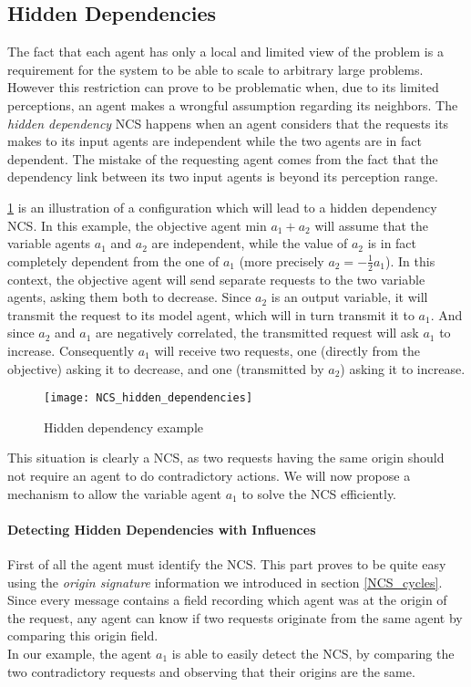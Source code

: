 \subsection{Hidden Dependencies}\label{hidden_deps}

The fact that each agent has only a local and limited view of the problem is a requirement for the system to be able to scale to arbitrary large problems. However this restriction can prove to be problematic when, due to its limited perceptions, an agent makes a wrongful assumption regarding its neighbors. The \emph{hidden dependency} NCS happens when an agent considers that the requests its makes to its input agents are independent while the two agents are in fact dependent. The mistake of the requesting agent comes from the fact that the dependency link between its two input agents is beyond its perception range.

\figurename{} \ref{NCS_hidden_dependencies} is an illustration of a configuration which will lead to a hidden dependency NCS. In this example, the objective agent $\text{min }a_1 + a_2$ will assume that the variable agents $a_1$ and $a_2$ are independent, while the value of $a_2$ is in fact completely dependent from the one of $a_1$ (more precisely $a_2 = -\frac{1}{2} a_1$). In this context, the objective agent will send separate requests to the two variable agents, asking them both to decrease. Since $a_2$ is an output variable, it will transmit the request to its model agent, which will in turn transmit it to $a_1$. And since $a_2$ and $a_1$ are negatively correlated, the transmitted request will ask $a_1$ to increase. Consequently $a_1$ will receive two requests, one (directly from the objective) asking it to decrease, and one (transmitted by $a_2$) asking it to increase.

\begin{figure}
\centering
\texttt{[image: NCS\_hidden\_dependencies]}
\caption{Hidden dependency example}\label{NCS_hidden_dependencies}
\end{figure}

This situation is clearly a NCS, as two requests having the same origin should not require an agent to do contradictory actions. We will now propose a mechanism to allow the variable agent $a_1$ to solve the NCS efficiently.

\paragraph*{Detecting Hidden Dependencies with Influences}
First of all the agent must identify the NCS. This part proves to be quite easy using the \emph{origin signature} information we introduced in section \ref{NCS_cycles}. Since every message contains a field recording which agent was at the origin of the request, any agent can know if two requests originate from the same agent by comparing this origin field.\\
In our example, the agent $a_1$ is able to easily detect the NCS, by comparing the two contradictory requests and observing that their origins are the same.

